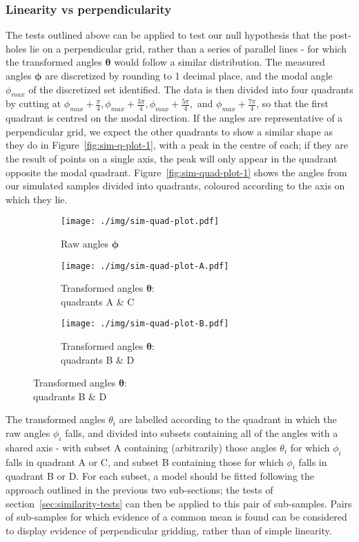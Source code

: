 \documentclass[../../ArchStats.tex]{subfiles}
\begin{document}
\subsubsection{Linearity vs perpendicularity}
\label{sssec:perpendicularity}
The tests outlined above can be applied to test our null hypothesis that the post-holes lie on a perpendicular grid, rather than a series of parallel lines - for which the transformed angles $\boldsymbol{\theta}$ would follow a similar distribution. The measured angles $\boldsymbol{\phi}$ are discretized by rounding to 1 decimal place, and the modal angle $\phi_{max}$ of the discretized set identified. The data is then divided into four quadrants by cutting at $\phi_{max} + \frac{\pi}{4}, \phi_{max} + \frac{3\pi}{4}, \phi_{max} + \frac{5\pi}{4},$ and $\phi_{max} + \frac{7\pi}{4}$, so that the first quadrant is centred on the modal direction. If the angles are representative of a perpendicular grid, we expect the other quadrants to show a similar shape as they do in Figure~\ref{fig:sim-q-plot-1}, with a peak in the centre of each; if they are the result of points on a single axis, the peak will only appear in the quadrant opposite the modal quadrant. Figure~\ref{fig:sim-quad-plot-1} shows the angles from our simulated samples divided into quadrants, coloured according to the axis on which they lie.

\begin{figure}[!h]
\centering
\caption{Raw angles from Figure \ref{fig:sim-plot-1} divided into quadrants, and plots of transformed angles of each pair of opposed quadrants}
\label{fig:sim-quad-plot-1}
\begin{subfigure}[t]{0.3\textwidth}
\centering
\caption{Raw angles $\boldsymbol{\phi}$}
\texttt{[image: ./img/sim-quad-plot.pdf]}
\end{subfigure}
\begin{subfigure}[t]{0.3\textwidth}
\centering
\caption{Transformed angles $\boldsymbol{\theta}$:\\ quadrants A \& C}
\texttt{[image: ./img/sim-quad-plot-A.pdf]}
\end{subfigure}
\begin{subfigure}[t]{0.3\textwidth}
\centering
\caption{Transformed angles $\boldsymbol{\theta}$:\\ quadrants B \& D}
\texttt{[image: ./img/sim-quad-plot-B.pdf]}
\end{subfigure}
\end{figure}

The transformed angles $\theta_i$ are labelled according to the quadrant in which the raw angles $\phi_i$ falls, and divided into subsets containing all of the angles with a shared axis - with subset A containing (arbitrarily) those angles $\theta_i$ for which $\phi_i$ falls in quadrant A or C, and subset B containing those for which $\phi_i$ falls in quadrant B or D. For each subset, a model should be fitted following the approach outlined in the previous two sub-sections; the tests of section~\ref{sec:similarity-tests} can then be applied to this pair of sub-samples. Pairs of sub-samples for which evidence of a common mean is found can be considered to display evidence of perpendicular gridding, rather than of simple linearity.
\end{document}
